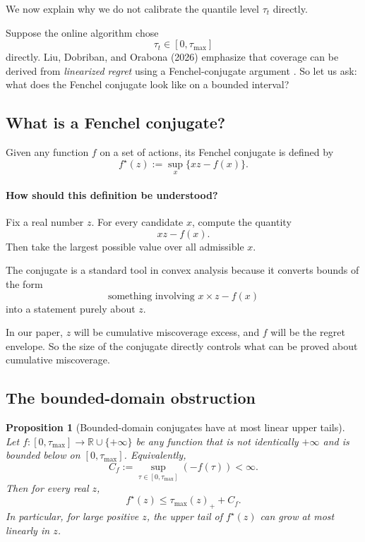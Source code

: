 \documentclass[11pt]{article}
\newtheorem{proposition}{Proposition}
\newcommand{\R}{\mathbb{R}}
\newcommand{\1}{\mathbf{1}}
\begin{document}
We now explain why we do not calibrate the quantile level $\tau_t$ directly.

Suppose the online algorithm chose
\[
\tau_t\in[0,\tau_{\max}]
\]
directly. Liu, Dobriban, and Orabona (2026) emphasize that coverage can be derived from \emph{linearized regret} using a Fenchel-conjugate argument \citep{LiuDobribanOrabona2026}. So let us ask: what does the Fenchel conjugate look like on a bounded interval?

\subsection{What is a Fenchel conjugate?}

Given any function $f$ on a set of actions, its Fenchel conjugate is defined by
\[
f^\star(z):=\sup_x\{xz-f(x)\}.
\]

\paragraph{How should this definition be understood?}
Fix a real number $z$. For every candidate $x$, compute the quantity
\[
xz-f(x).
\]
Then take the largest possible value over all admissible $x$.

The conjugate is a standard tool in convex analysis because it converts bounds of the form
\[
\text{something involving }x\times z - f(x)
\]
into a statement purely about $z$.

In our paper, $z$ will be cumulative miscoverage excess, and $f$ will be the regret envelope. So the size of the conjugate directly controls what can be proved about cumulative miscoverage.

\subsection{The bounded-domain obstruction}

\begin{proposition}[Bounded-domain conjugates have at most linear upper tails]
\label{prop:impossibility}
Let $f:[0,\tau_{\max}]\to\R\cup\{+\infty\}$ be any function that is not identically $+\infty$ and is bounded below on $[0,\tau_{\max}]$. Equivalently,
\[
C_f:=\sup_{\tau\in[0,\tau_{\max}]}(-f(\tau))<\infty.
\]
Then for every real $z$,
\[
f^\star(z)\le \tau_{\max}(z)_+ + C_f.
\]
In particular, for large positive $z$, the upper tail of $f^\star(z)$ can grow at most linearly in $z$.
\end{proposition}
\end{document}
